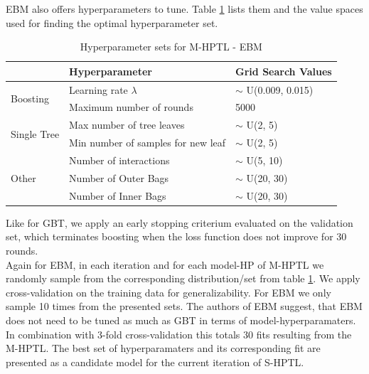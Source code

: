 \documentclass[12pt,titlepage]{article}
\begin{document}
EBM also offers hyperparameters to tune. Table \ref{hpebm} lists them and the value spaces used for finding the optimal hyperparameter set. \\
\begin{table}[H]
    \centering
    \begin{tabular}{|l|l|l|}
    \hline
    \multicolumn{1}{|l|}{}                                       & Hyperparameter                            & Grid Search Values       \\
    \hline
    \multirow{2}{*}{Boosting}                         & Learning rate $\lambda$                                                                & $\sim$ U(0.009, 0.015)  \\
    & Maximum number of rounds            &         5000        \\
    \hline
    \multicolumn{1}{|l|}{\multirow{2}{*}{Single Tree}} & Max number of tree leaves          &  $\sim$ U(2, 5)                        \\
    \multicolumn{1}{|l|}{}                                       & Min number of samples for new leaf   &      $\sim$ U(2, 5)       \\
    \hline
    \multicolumn{1}{|l|}{\multirow{3}{*}{Other}} & Number of interactions          &       $\sim$ U(5, 10)      \\
    \multicolumn{1}{|l|}{}                                       & Number of Outer Bags   &        $\sim$ U(20, 30)   \\
    \multicolumn{1}{|l|}{}                                       & Number of Inner Bags   &       $\sim$ U(20, 30)   \\
    \hline
    \end{tabular}
    \caption{Hyperparameter sets for M-HPTL - EBM}
\label{hpebm}
\end{table}
\vspace{3mm}
\noindent
Like for GBT, we apply an early stopping criterium evaluated on the validation set, which terminates boosting when the loss function does not improve for 30 rounds. \\
Again for EBM, in each iteration and for each model-HP of M-HPTL we randomly sample from the corresponding distribution/set from table \ref{hpebm}. We apply cross-validation on the training data for generalizability. For EBM we only sample 10 times from the presented sets. The authors of EBM suggest, that EBM does not need to be tuned as much as GBT in terms of model-hyperparamaters. In combination with 3-fold cross-validation this totals 30 fits resulting from the M-HPTL. The best set of hyperparamaters and its corresponding fit are presented as a candidate model for the current iteration of S-HPTL.\\
\end{document}
